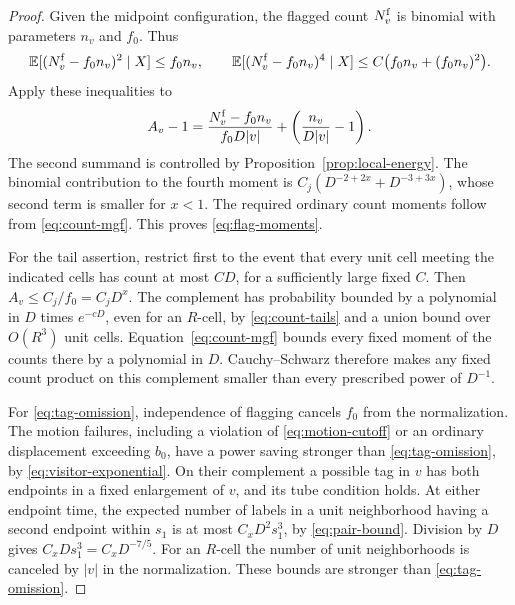 \begin{proof}
Given the midpoint configuration, the flagged count $N_v^{\rm f}$
is binomial with parameters $n_v$ and $f_0$.  Thus
\[
 \mathbb E[(N_v^{\rm f}-f_0n_v)^2\mid X]\le f_0n_v,
 \qquad
 \mathbb E[(N_v^{\rm f}-f_0n_v)^4\mid X]
     \le C\bigl(f_0n_v+(f_0n_v)^2\bigr).
\]
Apply these inequalities to
\[
 A_v-1=\frac{N_v^{\rm f}-f_0n_v}{f_0D|v|}
                  +\left(\frac{n_v}{D|v|}-1\right).
\]
The second summand is controlled by Proposition~\ref{prop:local-energy}.
The binomial contribution to the fourth moment is
$C_j(D^{-2+2x}+D^{-3+3x})$, whose second term is smaller for $x<1$.
The required ordinary count moments follow from
\eqref{eq:count-mgf}.  This proves \eqref{eq:flag-moments}.

For the tail assertion, restrict first to the event that every unit
cell meeting the indicated cells has count at most $CD$, for a
sufficiently large fixed $C$.  Then $A_v\le C_j/f_0=C_jD^x$.
The complement has probability bounded by a polynomial in $D$ times
$e^{-cD}$, even for an $R$-cell, by \eqref{eq:count-tails} and a union
bound over $O(R^3)$ unit cells.  Equation~\eqref{eq:count-mgf} bounds
every fixed moment of the counts there by a polynomial in $D$.
Cauchy--Schwarz therefore makes any fixed count product on this
complement smaller than every prescribed power of $D^{-1}$.

For \eqref{eq:tag-omission}, independence of flagging cancels $f_0$
from the normalization.  The motion failures, including a violation
of \eqref{eq:motion-cutoff} or an ordinary displacement exceeding
$b_0$, have a power saving stronger than
\eqref{eq:tag-omission}, by \eqref{eq:visitor-exponential}.
On their complement a possible tag
in $v$ has both endpoints in a fixed enlargement of $v$, and its tube
condition holds.  At either endpoint time, the expected number of
labels in a unit neighborhood having a second endpoint within $s_1$
is at most $C_xD^2s_1^3$, by \eqref{eq:pair-bound}.  Division by $D$
gives $C_xDs_1^3=C_xD^{-7/5}$.  For an $R$-cell the number of unit
neighborhoods is canceled by $|v|$ in the normalization.  These bounds
are stronger than \eqref{eq:tag-omission}.
\end{proof}

